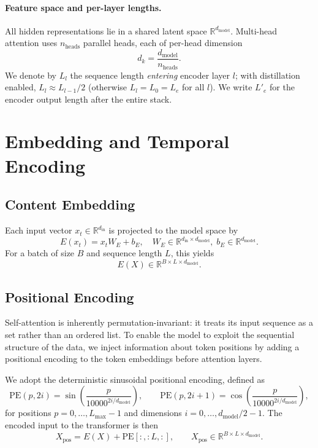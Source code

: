 \documentclass[11pt]{article}
\begin{document}
\paragraph{Feature space and per-layer lengths.}
All hidden representations lie in a shared latent space $\mathbb{R}^{d_{\text{model}}}$.
Multi-head attention uses $n_{\text{heads}}$ parallel heads, each of per-head dimension
\[
d_k = \frac{d_{\text{model}}}{n_{\text{heads}}}.
\]
We denote by $L_l$ the sequence length \emph{entering} encoder layer $l$; with distillation enabled, $L_{l} \approx L_{l-1}/2$ (otherwise $L_l=L_0=L_e$ for all $l$). We write $L'_e$ for the encoder output length after the entire stack.

\section{Embedding and Temporal Encoding}

\subsection{Content Embedding}
Each input vector $x_t\in\mathbb{R}^{d_{\text{in}}}$ is projected to the model space by
\[
E(x_t) = x_t W_E + b_E,
\quad
W_E \in \mathbb{R}^{d_{\text{in}}\times d_{\text{model}}},\; b_E\in\mathbb{R}^{d_{\text{model}}}.
\]
For a batch of size $B$ and sequence length $L$, this yields
\[
E(X)\in\mathbb{R}^{B\times L\times d_{\text{model}}}.
\]

\subsection{Positional Encoding}\label{subsec:positional-encoding}

Self-attention is inherently permutation-invariant: it treats its input sequence as a set rather than an ordered list.
To enable the model to exploit the sequential structure of the data, we inject information about token positions by adding a positional encoding to the token embeddings before attention layers.

We adopt the deterministic sinusoidal positional encoding, defined as
\[
\text{PE}(p,2i)   = \sin\!\left(\frac{p}{10000^{2i/d_{\text{model}}}}\right),\qquad
\text{PE}(p,2i+1) = \cos\!\left(\frac{p}{10000^{2i/d_{\text{model}}}}\right),
\]
for positions \(p = 0, \dots, L_{\max}-1\) and dimensions \(i = 0, \dots, d_{\text{model}}/2 - 1\).
The encoded input to the transformer is then
\[
X_{\text{pos}} = E(X) + \text{PE}[:, :L, :], \qquad X_{\text{pos}}\in\mathbb{R}^{B\times L\times d_{\text{model}}}.
\]
\end{document}
